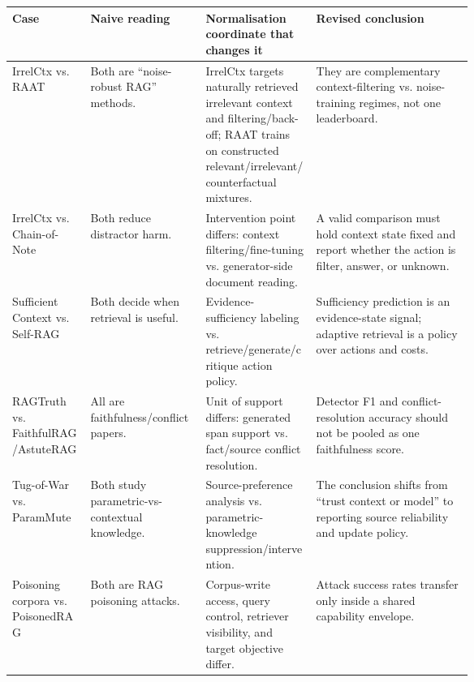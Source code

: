 \begin{table}[t]
\centering
\scriptsize
\renewcommand{\arraystretch}{0.82}
\begin{tabularx}{\linewidth}{>{\raggedright\arraybackslash}p{0.17\linewidth}>{\raggedright\arraybackslash}p{0.25\linewidth}>{\raggedright\arraybackslash}p{0.24\linewidth}X}
\toprule
\textbf{Case} & \textbf{Naive reading} & \textbf{Normalisation coordinate that changes it} & \textbf{Revised conclusion} \\
\midrule
IrrelCtx \citep{irrelevantContext2023} vs. RAAT \citep{raat2024} & Both are ``noise-robust RAG'' methods. & IrrelCtx targets naturally retrieved irrelevant context and filtering/back-off; RAAT trains on constructed relevant/irrelevant/counterfactual mixtures. & They are complementary context-filtering vs. noise-training regimes, not one leaderboard. \\
IrrelCtx \citep{irrelevantContext2023} vs. Chain-of-Note \citep{chainOfNote2023} & Both reduce distractor harm. & Intervention point differs: context filtering/fine-tuning vs. generator-side document reading. & A valid comparison must hold context state fixed and report whether the action is filter, answer, or unknown. \\
Sufficient Context \citep{sufficientContext2024} vs. Self-RAG \citep{selfRAG2023} & Both decide when retrieval is useful. & Evidence-sufficiency labeling vs. retrieve/generate/critique action policy. & Sufficiency prediction is an evidence-state signal; adaptive retrieval is a policy over actions and costs. \\
RAGTruth \citep{ragTruth2024} vs. FaithfulRAG/AstuteRAG \citep{faithfulRAG2025,astuteRAG2025} & All are faithfulness/conflict papers. & Unit of support differs: generated span support vs. fact/source conflict resolution. & Detector F1 and conflict-resolution accuracy should not be pooled as one faithfulness score. \\
Tug-of-War \citep{tugOfWar2024} vs. ParamMute \citep{rrag024} & Both study parametric-vs-contextual knowledge. & Source-preference analysis vs. parametric-knowledge suppression/intervention. & The conclusion shifts from ``trust context or model'' to reporting source reliability and update policy. \\
Poisoning corpora \citep{poisoningRetrievalCorpora2023} vs. PoisonedRAG \citep{poisonedRAG2024} & Both are RAG poisoning attacks. & Corpus-write access, query control, retriever visibility, and target objective differ. & Attack success rates transfer only inside a shared capability envelope. \\

\end{tabularx}
\end{table}
